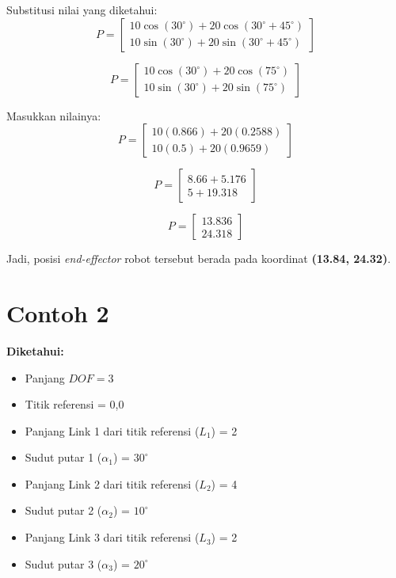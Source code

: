 \documentclass[12pt, a4paper, bahasa]{article}
\begin{document}
Substitusi nilai yang diketahui:
\begin{equation}
    P = \begin{bmatrix}
        10 \cos(30^\circ) + 20 \cos(30^\circ + 45^\circ) \\
        10 \sin(30^\circ) + 20 \sin(30^\circ + 45^\circ)
    \end{bmatrix}
\end{equation}

\begin{equation}
    P = \begin{bmatrix}
        10 \cos(30^\circ) + 20 \cos(75^\circ) \\
        10 \sin(30^\circ) + 20 \sin(75^\circ)
    \end{bmatrix}
\end{equation}

Masukkan nilainya:
\begin{equation}
    P = \begin{bmatrix}
        10(0.866) + 20(0.2588) \\
        10(0.5) + 20(0.9659)
    \end{bmatrix}
\end{equation}

\begin{equation}
    P = \begin{bmatrix}
        8.66 + 5.176 \\
        5 + 19.318
    \end{bmatrix}
\end{equation}

\begin{equation}
    P = \begin{bmatrix}
        13.836 \\
        24.318
    \end{bmatrix}
\end{equation}

Jadi, posisi \textit{end-effector} robot tersebut berada pada koordinat \textbf{(13.84, 24.32)}.

\section*{Contoh 2}
\textbf{Diketahui:}
\begin{itemize}
    \item Panjang $DOF = 3$
    \item Titik referensi = 0,0
    \item Panjang Link 1 dari titik referensi ($L_1$) = 2
    \item Sudut putar 1 ($\alpha_1$) = $30^\circ$
    \item Panjang Link 2 dari titik referensi ($L_2$) = 4
    \item Sudut putar 2 ($\alpha_2$) = $10^\circ$
    \item Panjang Link 3 dari titik referensi ($L_3$) = 2
    \item Sudut putar 3 ($\alpha_3$) = $20^\circ$
\end{itemize}
\end{document}
